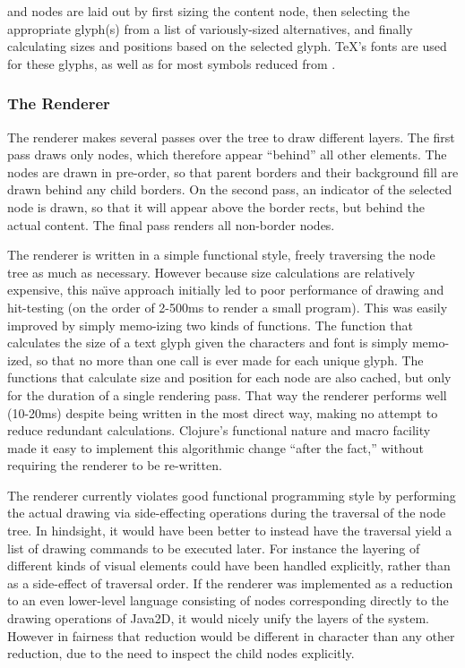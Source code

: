  and  nodes are laid out by first sizing the content node, then selecting the appropriate glyph(s) from a list of variously-sized alternatives, and finally calculating sizes and positions based on the selected glyph. \TeX's fonts are used for these glyphs, as well as for most symbols reduced from . 


\subsubsection{The Renderer}

The renderer makes several passes over the tree to draw different layers. The first pass draws only  nodes, which therefore appear ``behind'' all other elements. The nodes are drawn in pre-order, so that parent borders and their background fill are drawn behind any child borders. On the second pass, an indicator of the selected node is drawn, so that it will appear above the border rects, but behind the actual content. The final pass renders all non-border nodes.  

The renderer is written in a simple functional style, freely traversing the node tree as much as necessary. However because size calculations are relatively expensive, this na\"{\i}ve approach initially led to poor performance of drawing and hit-testing (on the order of 2-500ms to render a small program). This was easily improved by simply memo-izing two kinds of functions. The function that calculates the size of a text glyph given the characters and font is simply memo-ized, so that no more than one call is ever made for each unique glyph. The functions that calculate size and position for each node are also cached, but only for the duration of a single rendering pass. That way the renderer performs well (10-20ms) despite being written in the most direct way, making no attempt to reduce redundant calculations. Clojure's functional nature and macro facility made it easy to implement this algorithmic change ``after the fact,'' without requiring the renderer to be re-written.

The renderer currently violates good functional programming style by performing the actual drawing via side-effecting operations during the traversal of the node tree. In hindsight, it would have been better to instead have the traversal yield a list of drawing commands to be executed later. For instance the layering of different kinds of visual elements could have been handled explicitly, rather than as a side-effect of traversal order. If the renderer was implemented as a reduction to an even lower-level language consisting of nodes corresponding directly to the drawing operations of Java2D, it would nicely unify the layers of the system. However in fairness that reduction would be different in character than any other reduction, due to the need to inspect the child nodes explicitly.



